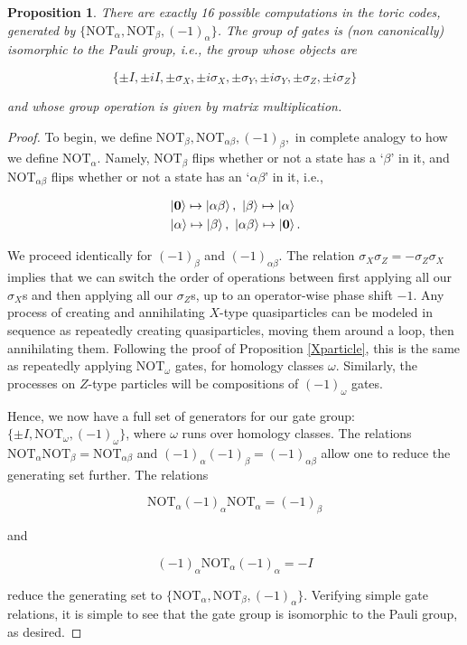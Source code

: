 \documentclass{article}
\newtheorem{proposition}{Proposition}[section]
\theoremstyle{definition}
\numberwithin{figure}{section}
\begin{document}
\begin{proposition}\label{Yparticle} There are exactly 16 possible computations in the toric codes, generated by $\{\text{NOT}_{\alpha},\text{NOT}_{\beta},(-1)_{\alpha}\}$. The group of gates is (non canonically) isomorphic to the Pauli group, i.e., the group whose objects are

$$\{\pm I, \pm iI, \pm \sigma_X, \pm i \sigma_X, \pm \sigma_Y, \pm i\sigma_Y, \pm \sigma_Z, \pm i \sigma_Z\}$$

and whose group operation is given by matrix multiplication.
\end{proposition}
\begin{proof} To begin, we define $\text{NOT}_{\beta},\text{NOT}_{\alpha\beta},(-1)_{\beta},$ in complete analogy to how we define $\text{NOT}_{\alpha}$. Namely, $\text{NOT}_{\beta}$ flips whether or not a state has a `$\beta$' in it, and $\text{NOT}_{\alpha\beta}$ flips whether or not a state has an `$\alpha\beta$' in it, i.e.,

\begin{align*}
&\left|\bold{0}\right> \mapsto \left|\alpha\beta\right>,\,\, \left|\beta\right> \mapsto \left|\alpha\right> \\
&\left|\alpha\right> \mapsto \left|\beta\right>,\,\, \left|\alpha\beta\right> \mapsto \left|\bold{0}\right>.
\end{align*}

We proceed identically for $(-1)_{\beta}$ and $(-1)_{\alpha\beta}$. The relation $\sigma_X\sigma_Z=-\sigma_Z\sigma_X$ implies that we can switch the order of operations between first applying all our $\sigma_X$s and then applying all our $\sigma_Z$s, up to an operator-wise phase shift $-1$. Any process of creating and annihilating $X$-type quasiparticles can be modeled in sequence as repeatedly creating quasiparticles, moving them around a loop, then annihilating them. Following the proof of Proposition \ref{Xparticle}, this is the same as repeatedly applying $\text{NOT}_{\omega}$ gates, for homology classes $\omega$. Similarly, the processes on $Z$-type particles will be compositions of $(-1)_{\omega}$ gates.

Hence, we now have a full set of generators for our gate group: $\{\pm I, \text{NOT}_{\omega}, (-1)_{\omega}\}$, where $\omega$ runs over homology classes. The relations $\text{NOT}_{\alpha}\text{NOT}_{\beta}=\text{NOT}_{\alpha\beta}$ and $(-1)_{\alpha}(-1)_{\beta}=(-1)_{\alpha\beta}$ allow one to reduce the generating set further. The relations

$$\text{NOT}_{\alpha}(-1)_{\alpha}\text{NOT}_{\alpha}=(-1)_{\beta}$$

and

$$(-1)_{\alpha}\text{NOT}_{\alpha}(-1)_{\alpha}=-I$$

reduce the generating set to $\{\text{NOT}_{\alpha},\text{NOT}_{\beta},(-1)_{\alpha}\}$. Verifying simple gate relations, it is simple to see that the gate group is isomorphic to the Pauli group, as desired.
\end{proof}
\end{document}
